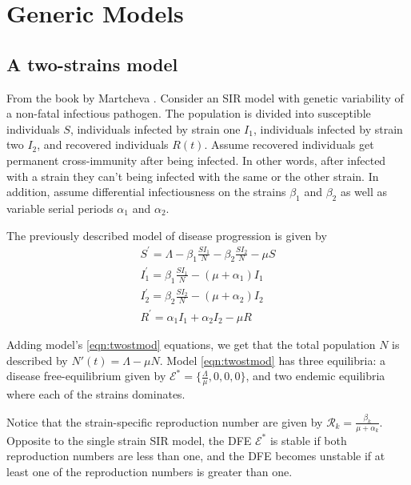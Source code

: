 \documentclass{book}\usepackage[]{graphicx}\usepackage[]{color}
\begin{document}

\chapter{Generic Models}
\label{chapt:genmods}

\section{A two-strains model}

From the book by Martcheva \cite{martcheva2015introduction}. Consider an SIR model with  genetic variability of a non-fatal infectious pathogen. The population is divided into susceptible individuals $S$, individuals infected by strain one $I_{1}$, individuals infected by strain two $I_{2}$, and recovered individuals $R(t)$. Assume recovered individuals get permanent cross-immunity after being infected. In other words, after infected with a strain they can't being infected with the same or the other strain.
%
In addition, assume differential infectiousness on the strains $\beta_1$ and $\beta_2$ as well as variable serial periods $\alpha_1$ and $\alpha_2$.

The previously described model of disease progression is given by 
\begin{equation} \label{eqn:twostmod}
\begin{array}{l}
S^{\prime}=\Lambda-\beta_{1} \frac{S I_{1}}{N}-\beta_{2} \frac{S I_{2}}{N}-\mu S \\
I_{1}^{\prime}=\beta_{1} \frac{S I_{1}}{N}-\left(\mu+\alpha_{1}\right) I_{1} \\
I_{2}^{\prime}=\beta_{2} \frac{S I_{2}}{N}-\left(\mu+\alpha_{2}\right) I_{2} \\
R^{\prime}=\alpha_{1} I_{1}+\alpha_{2} I_{2}-\mu R
\end{array}
\end{equation}

Adding model's \ref{eqn:twostmod} equations, we get that the total population $N$ is described by $N'(t)=\Lambda-\mu N$.
%
Model \ref{eqn:twostmod} has three equilibria: a disease free-equilibrium given by $\mathcal{E}^*=\{\frac{\Lambda}{\mu},0,0,0\}$, and two endemic equilibria where each of the strains dominates.

Notice that the strain-specific reproduction number are given by $\mathcal{R}_k=\frac{\beta_k}{\mu+\alpha_k}$. Opposite to the single strain SIR model, the DFE $\mathcal{E}^*$ is stable if both reproduction numbers are less than one, and the DFE becomes unstable if at least one of the reproduction numbers is greater than one.
\end{document}
